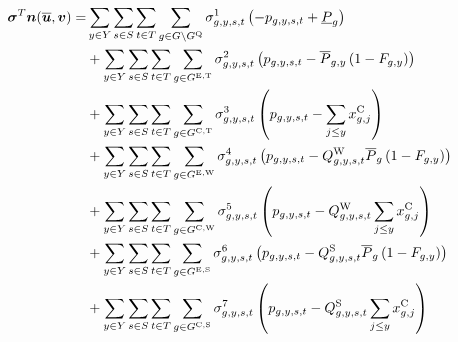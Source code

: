 \documentclass{article}
\begin{document}
\begin{align}
	\bm{\sigma}^{T}\bm{n}(\bm{\overline{u}}, \bm{v}) = & \sum\limits_{\iYear \in \sYears}\sum\limits_{\iScenario \in \sScenarios}\sum\limits_{\iInterval \in \sIntervals} \sum\limits_{\iGenerator \in \sGenerators \setminus \sStorage} \dMinPowerOutput \left(-\vPower + \cPowerOutputMin\right) \nonumber\\
	& + \sum\limits_{\iYear \in \sYears}\sum\limits_{\iScenario \in \sScenarios}\sum\limits_{\iInterval \in \sIntervals} \sum\limits_{\iGenerator \in \sGeneratorsExistingThermal} \dMaxPowerOutputExistingThermal \left(\vPower - \cPowerOutputMax \left(1 - \cRetirementIndicator\right)\right) \nonumber\\
	& + \sum\limits_{\iYear \in \sYears}\sum\limits_{\iScenario \in \sScenarios}\sum\limits_{\iInterval \in \sIntervals} \sum\limits_{\iGenerator \in \sGeneratorsCandidateThermal} \dMaxPowerOutputCandidateThermal \left(\vPower - \sum\limits_{\iYearAlias \leq \iYear} \vInstalledCapacity[\iGenerator,\iYearAlias]\right) \nonumber\\
	& + \sum\limits_{\iYear \in \sYears}\sum\limits_{\iScenario \in \sScenarios}\sum\limits_{\iInterval \in \sIntervals} \sum\limits_{\iGenerator \in \sGeneratorsExistingWind} \dMaxPowerOutputWindExisting \left(\vPower - \cCapacityFactorWind \cPowerOutputMax[\iGenerator] \left(1 - \cRetirementIndicator\right) \right) \nonumber\\
	& + \sum\limits_{\iYear \in \sYears}\sum\limits_{\iScenario \in \sScenarios}\sum\limits_{\iInterval \in \sIntervals} \sum\limits_{\iGenerator \in \sGeneratorsCandidateWind} \dMaxPowerOutputWindCandidate \left(\vPower - \cCapacityFactorWind \sum\limits_{\iYearAlias \leq \iYear} \vInstalledCapacity[\iGenerator,\iYearAlias]\right) \nonumber\\
	& + \sum\limits_{\iYear \in \sYears}\sum\limits_{\iScenario \in \sScenarios}\sum\limits_{\iInterval \in \sIntervals} \sum\limits_{\iGenerator \in \sGeneratorsExistingSolar} \dMaxPowerOutputSolarExisting \left(\vPower - \cCapacityFactorSolar \cPowerOutputMax[\iGenerator] \left(1 - \cRetirementIndicator\right)\right) \nonumber\\
	& + \sum\limits_{\iYear \in \sYears}\sum\limits_{\iScenario \in \sScenarios}\sum\limits_{\iInterval \in \sIntervals} \sum\limits_{\iGenerator \in \sGeneratorsCandidateSolar} \dMaxPowerOutputSolarCandidate \left(\vPower - \cCapacityFactorSolar \sum\limits_{\iYearAlias \leq \iYear} \vInstalledCapacity[\iGenerator,\iYearAlias]\right) \nonumber\\

\end{align}
\end{document}
